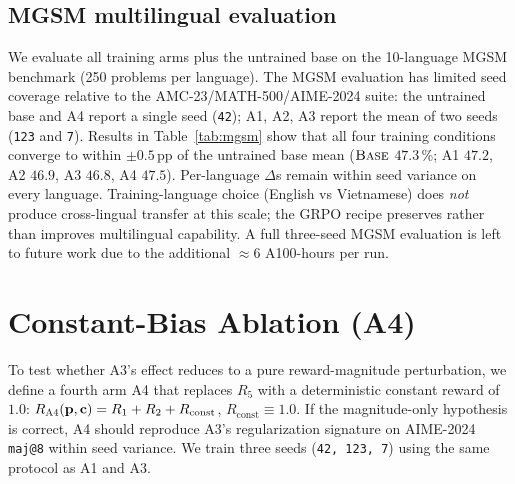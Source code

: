 \documentclass[11pt]{article}
\newcommand{\armA}{\textsc{A1}}
\newcommand{\armB}{\textsc{A2}}
\newcommand{\armC}{\textsc{A3}}
\newcommand{\armD}{\textsc{A4}}
\newcommand{\base}{\textsc{Base}}
\newcommand{\R}[1]{R_{#1}}
\begin{document}
\subsection{MGSM multilingual evaluation}
\label{sec:mgsm}
We evaluate all training arms plus the untrained base on the
10-language MGSM benchmark (250 problems per language). The MGSM
evaluation has limited seed coverage relative to the
AMC-23/MATH-500/AIME-2024 suite: the untrained base and \armD{} report
a single seed (\texttt{42}); \armA{}, \armB{}, \armC{} report the mean
of two seeds (\texttt{123} and \texttt{7}). Results in
Table~\ref{tab:mgsm} show that all four training conditions converge
to within $\pm 0.5$\,pp of the untrained base mean
($\base{}$ $47.3$\,\%; \armA{} $47.2$, \armB{} $46.9$, \armC{} $46.8$,
\armD{} $47.5$). Per-language $\Delta$s remain within seed variance on
every language. Training-language choice (English vs Vietnamese) does
\emph{not} produce cross-lingual transfer at this scale; the GRPO
recipe preserves rather than improves multilingual capability. A full
three-seed MGSM evaluation is left to future work due to the
additional $\approx 6$ A100-hours per run.



\section{Constant-Bias Ablation (\armD{})}
\label{sec:a4_ablation}

To test whether \armC{}'s effect reduces to a pure reward-magnitude
perturbation, we define a fourth arm \armD{} that replaces $\R{5}$ with
a deterministic constant reward of $1.0$:
$R_{\armD{}}(\mathbf{p},\mathbf{c}) = \R{1}+\R{2}+\R{\text{const}}$,
$\R{\text{const}}\equiv 1.0$. If the magnitude-only hypothesis is
correct, \armD{} should reproduce \armC{}'s regularization signature on
AIME-2024 \texttt{maj@8} within seed variance. We train three seeds
(\texttt{42, 123, 7}) using the same protocol as \armA{} and \armC{}.
\end{document}
